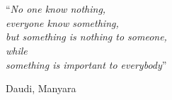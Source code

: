 \documentclass[a4paper,11pt]{book}
\newcommand{\quotes}[1]{``#1''}
\begin{document}

\thispagestyle{empty}

\begin{flushright}
\end{flushright}

\chapter*{}
\epigraph{\quotes{\emph{No one know nothing,\\everyone know something,\\but something is nothing to someone,\\while\\something is important to everybody}}}{Daudi, Manyara}



\tableofcontents
\newpage








\end{document}
